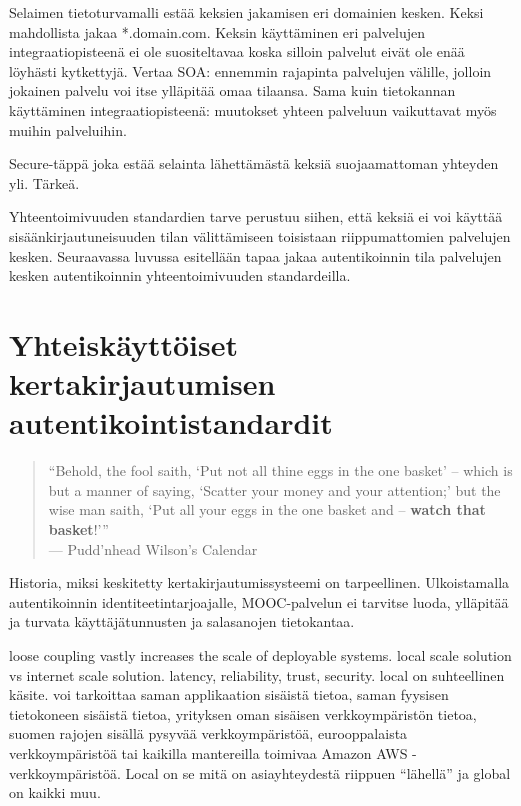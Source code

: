 \documentclass[finnish,gradu]{tktltiki}
\begin{document}
Selaimen tietoturvamalli estää keksien jakamisen eri domainien kesken. Keksi mahdollista jakaa *.domain.com. Keksin käyttäminen eri palvelujen integraatiopisteenä ei ole suositeltavaa koska silloin palvelut eivät ole enää löyhästi kytkettyjä. Vertaa SOA: ennemmin rajapinta palvelujen välille, jolloin jokainen palvelu voi itse ylläpitää omaa tilaansa. Sama kuin tietokannan käyttäminen integraatiopisteenä: muutokset yhteen palveluun vaikuttavat myös muihin palveluihin.

Secure-täppä joka estää selainta lähettämästä keksiä suojaamattoman yhteyden yli. Tärkeä.

Yhteentoimivuuden standardien tarve perustuu siihen, että keksiä ei voi käyttää sisäänkirjautuneisuuden tilan välittämiseen toisistaan riippumattomien palvelujen kesken. Seuraavassa luvussa esitellään tapaa jakaa autentikoinnin tila palvelujen kesken autentikoinnin yhteentoimivuuden standardeilla.




\section{Yhteiskäyttöiset kertakirjautumisen autentikointistandardit} %
\label{sec:Kertakirjautumisstandardit}
  \begin{quote}
      ``Behold, the fool saith, `Put not all thine eggs in the one basket'
      -- which is but a manner of saying, `Scatter your money and your attention;'
      but the wise man saith, `Put all your eggs in the one basket and -- \textbf{watch that basket}!'''
      \\--- Pudd'nhead Wilson's Calendar~\cite{twain_eggs_1894}
  \end{quote}

  Historia, miksi keskitetty kertakirjautumissysteemi on tarpeellinen.
  Ulkoistamalla autentikoinnin identiteetintarjoajalle, MOOC-palvelun ei tarvitse luoda, ylläpitää ja turvata käyttäjätunnusten ja salasanojen tietokantaa.

  loose coupling vastly increases the scale of deployable systems.
  local scale solution vs internet scale solution.
  latency, reliability, trust, security.
  local on suhteellinen käsite. voi tarkoittaa saman applikaation sisäistä tietoa, saman fyysisen tietokoneen sisäistä tietoa, yrityksen oman sisäisen verkkoympäristön tietoa, suomen rajojen sisällä pysyvää verkkoympäristöä, eurooppalaista verkkoympäristöä tai kaikilla mantereilla toimivaa Amazon AWS -verkkoympäristöä. Local on se mitä on asiayhteydestä riippuen ``lähellä'' ja global on kaikki muu.
\end{document}
